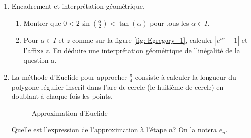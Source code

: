 \begin{enumerate}
  \item Encadrement et interprétation géométrique. 
  \begin{enumerate}
    \item Montrer que $0< 2\sin(\frac{\alpha}{2}) < \tan(\alpha)$ pour tous les $\alpha\in I$.
    \item Pour $\alpha \in I$ et $z$ comme sur la figure \ref{fig: Egregory_1}, calculer $|e^{i\alpha} -1|$ et l'affixe $z$. En déduire une interprétation géométrique de l'inégalité de la question a.
  \end{enumerate}

  \item La méthode d'Euclide pour approcher $\frac{\pi}{4}$ consiste à calculer la longueur du polygone régulier inscrit dans l'arc de cercle (le huitième de cercle) en doublant à chaque fois les points.
  
\begin{figure}[h]
  \centering
    \hspace{5pt}
    \hspace{5pt}
  \caption{Approximation d'Euclide}
\end{figure}
Quelle est l'expression de l'approximation à l'étape $n$? On la notera $e_n$.


\end{enumerate}
